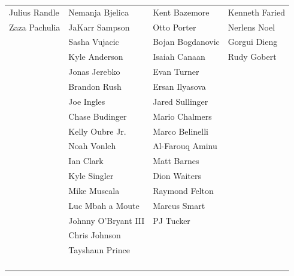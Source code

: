 \documentclass{article}
\begin{document}
\begin{table}[ht]
{\begin{tabular}{llll}
  Julius Randle & Nemanja Bjelica & Kent Bazemore & Kenneth Faried \\ 
  Zaza Pachulia & JaKarr Sampson & Otto Porter & Nerlens Noel \\ 
   & Sasha Vujacic & Bojan Bogdanovic & Gorgui Dieng \\ 
   & Kyle Anderson & Isaiah Canaan & Rudy Gobert \\ 
   & Jonas Jerebko & Evan Turner &  \\ 
   & Brandon Rush & Ersan Ilyasova &  \\ 
   & Joe Ingles & Jared Sullinger &  \\ 
   & Chase Budinger & Mario Chalmers &  \\ 
   & Kelly Oubre Jr. & Marco Belinelli &  \\ 
   & Noah Vonleh & Al-Farouq Aminu &  \\ 
   & Ian Clark & Matt Barnes &  \\ 
   & Kyle Singler & Dion Waiters &  \\ 
   & Mike Muscala & Raymond Felton &  \\ 
   & Luc Mbah a Moute & Marcus Smart &  \\ 
   & Johnny O'Bryant III & PJ Tucker &  \\ 
   & Chris Johnson &  &  \\ 
   & Tayshaun Prince &  &  \\ 
   &  &  &  \\ 
   &  &  &  \\ 
   &  &  &  \\ 
   &  &  &  \\ 
   \hline
\end{tabular}%
}
\end{table}
\end{document}
